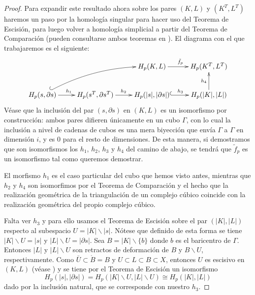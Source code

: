 \documentclass[12pt,a4paper,twoside]{article} %
\theoremstyle{plain}
\theoremstyle{definition}
\newcommand{\geom}[1]{\lvert #1 \rvert}
\begin{document}
\begin{proof}
Para expandir este resultado ahora sobre los pares $(K,L)$ y $(K^T, L^T)$ haremos un paso por la homología singular para hacer uso del Teorema de Escisión, para luego volver a homología simplicial a partir del Teorema de Comparación (pueden consultarse ambos teoremas en \cite{Navarro}). El diagrama con el que trabajaremos es el siguiente:
\begin{equation*}
\xymatrix{
                         &                               & H_p(K,L) \ar[r]^{\tilde{f}_p}        & H_p(K^T,L^T) \\
H_p(s,\partial s) \ar[r]^{h_1} \ar@/^1.0pc/@{^{(}->}[rru] & H_p(s^T,\partial s ^T) \ar[r]^{h_2} & H_p(\geom{s},\geom{\partial s}) \ar@{^{(}->}[r]^{h_3} & H_p(\geom{K},\geom{L}) \ar[u]^{h_4}  
}
\end{equation*}
Véase que la inclusión del par $(s, \partial s)$ en $(K,L)$ es un isomorfismo por construcción: ambos pares difieren únicamente en un cubo $\Gamma$, con lo cual la inclusión a nivel de cadenas de cubos es una mera biyección que envía $\Gamma$ a $\Gamma$ en dimensión $i$, y es 0 para el resto de dimensiones. De esta manera, si demostramos que son isomorfismos los $h_1$, $h_2$, $h_3$ y $h_4$ del camino de abajo, se tendrá que $\tilde{f}_p$ es un isomorfismo tal como queremos demostrar.

El morfismo $h_1$ es el caso particular del cubo que hemos visto antes, mientras que $h_2$ y $h_4$ son isomorfimos por el Teorema de Comparación y el hecho que la realización geométrica de la triangulación de un complejo cúbico coincide con la realización geométrica del propio complejo cúbico.

Falta ver $h_3$ y para ello usamos el Teorema de Escisión sobre el par $(\geom{K}, \geom{L})$ respecto al subespacio $U=\geom{K}\backslash\geom{s}$. Nótese que definido de esta forma se tiene $\geom{K} \backslash U = \geom{s}$ y $\geom{L} \backslash U = \geom{\partial s}$. Sea $B= \geom{K} \backslash \{ b \}$ donde $b$ es el baricentro de $\Gamma$. Entonces $\geom{L}$ y $\geom{L} \backslash U$ son retractos de deformación de $B$ y $B \backslash U$, respectivamente. Como $\bar{U} \subset \mathring{B}=B$ y $U \subset L \subset B \subset X$, entonces $U$ es escisivo en $(K,L)$ (véase \cite{Navarro}) y se tiene por el Teorema de Escisión un isomorfismo
$$ H_p(\geom{s}, \geom{\partial s}) = H_p(\geom{K} \backslash U, \geom{L} \backslash U) \cong H_p(\geom{K}, \geom{L}) $$
dado por la inclusión natural, que se corresponde con nuestro $h_3$.

\end{proof}
\end{document}
